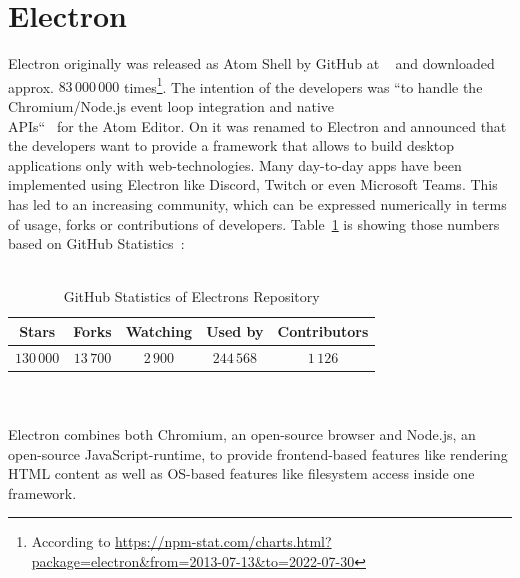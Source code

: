 \section{Electron}
\label{sec:electron}
Electron originally was released as Atom Shell by GitHub at ~\cite{githubReleaseV010} and downloaded approx. $83\,000\,000$ times\footnote{According to \url{https://npm-stat.com/charts.html?package=electron&from=2013-07-13&to=2022-07-30}}.
The intention of the developers was ``to handle the Chromium/Node.js event loop integration and native\\APIs``~\cite{sawicki_2015} for the Atom Editor.
On  it was renamed to Electron and announced that the developers want to provide a framework that allows to build desktop applications only with web-technologies.
Many day-to-day apps have been implemented using Electron like Discord, Twitch or even Microsoft Teams.
This has led to an increasing community, which can be expressed numerically in terms of usage, forks or contributions of developers.
Table~\ref{tab:electron:statistics} is showing those numbers based on GitHub Statistics~\cite{GithubElectron}: \\ \\
\begin{table}[h]
    \begin{tabular} {| c | c | c | c | c |}
        Stars      & Forks     & Watching & Used by    & Contributors \\ \hline
        $130\,000$ & $13\,700$ & $2\,900$ & $244\,568$ & $1\,126$
    \end{tabular}
    \caption{\label{tab:electron:statistics}GitHub Statistics of Electrons Repository}
\end{table}\\ \\
Electron combines both Chromium, an open-source browser and Node.js, an open-source JavaScript-runtime, to provide frontend-based features like rendering \ac{HTML} content as well as \ac{OS}-based features like filesystem access inside one framework.
